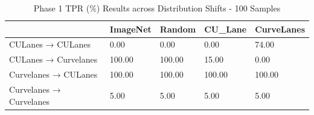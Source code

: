 \begin{table}
\caption{Phase 1 TPR (\%) Results across Distribution Shifts - 100 Samples}
\label{tab:phase1_tpr_100}
\begin{tabular}{lllll}
\toprule
 & ImageNet & Random & CU_Lane & CurveLanes \\
\midrule
CULanes → CULanes & 0.00 & 0.00 & 0.00 & 74.00 \\
CULanes → Curvelanes & 100.00 & 100.00 & 15.00 & 0.00 \\
Curvelanes → CULanes & 100.00 & 100.00 & 100.00 & 100.00 \\
Curvelanes → Curvelanes & 5.00 & 5.00 & 5.00 & 5.00 \\
\bottomrule
\end{tabular}
\end{table}
